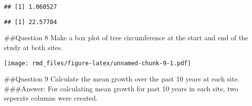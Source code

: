 \documentclass[]{article}
\newenvironment{Shaded}{\begin{snugshade}}{\end{snugshade}}
\newcommand{\DataTypeTok}[1]{\textcolor[rgb]{0.13,0.29,0.53}{#1}}
\newcommand{\DecValTok}[1]{\textcolor[rgb]{0.00,0.00,0.81}{#1}}
\newcommand{\KeywordTok}[1]{\textcolor[rgb]{0.13,0.29,0.53}{\textbf{#1}}}
\newcommand{\NormalTok}[1]{#1}
\newcommand{\OperatorTok}[1]{\textcolor[rgb]{0.81,0.36,0.00}{\textbf{#1}}}
\newcommand{\StringTok}[1]{\textcolor[rgb]{0.31,0.60,0.02}{#1}}
\begin{document}
\begin{verbatim}
## [1] 1.060527
\end{verbatim}

\begin{Shaded}
\end{Shaded}

\begin{verbatim}
## [1] 22.57784
\end{verbatim}

\#\#Question 8 Make a box plot of tree circumference at the start and
end of the study at both sites.

\begin{Shaded}
\end{Shaded}

\texttt{[image: rmd\_files/figure-latex/unnamed-chunk-9-1.pdf]}

\#\#Question 9 Calculate the mean growth over the past 10 years at each
site. \#\#\#Answer: For calculating mean growth for past 10 years in
each site, two seperate columns were created.

\begin{Shaded}
\end{Shaded}
\end{document}
